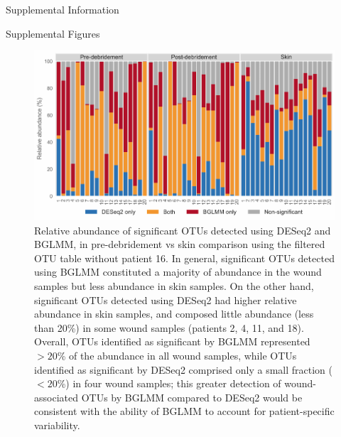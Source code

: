 \documentclass[oneside,12pt,final]{sty/ucthesis-CA2012}
\begin{document}
\begin{mainmatter}
\begin{section}{Supplemental Information}
\begin{subsection}{Supplemental Figures}
\begin{figure}[h]
\centering
\centerline{\includegraphics[width=\textwidth]{fig/C3figS7.pdf}}
\caption{Relative abundance of significant OTUs detected using DESeq2 and BGLMM, in pre-debridement vs skin comparison using the filtered OTU table without patient 16. In general, significant OTUs detected using BGLMM constituted a majority of abundance in the wound samples but less abundance in skin samples. On the other hand, significant OTUs detected using DESeq2 had higher relative abundance in skin samples, and composed little abundance (less than 20\%) in some wound samples (patients 2, 4, 11, and 18). Overall, OTUs identified as significant by BGLMM represented $>20$\% of the abundance in all wound samples, while OTUs identified as significant by DESeq2 comprised only a small fraction ($<20$\%) in four wound samples; this greater detection of wound-associated OTUs by BGLMM compared to DESeq2 would be consistent with the ability of BGLMM to account for patient-specific variability.}
\label{fig:S7}
\end{figure}


\end{subsection}
\end{section}
\end{mainmatter}
\end{document}
